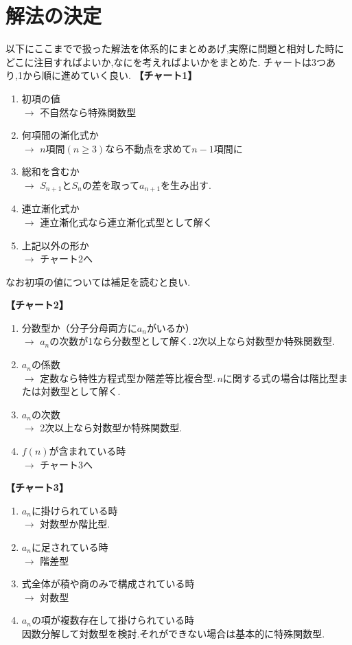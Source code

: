 
  \section{解法の決定}
    以下にここまでで扱った解法を体系的にまとめあげ,実際に問題と相対した時にどこに注目すればよいか,なにを考えればよいかをまとめた.
    チャートは3つあり,1から順に進めていく良い.
    \noindent \textbf{【チャート1】}
    \begin{enumerate}
      \item 初項の値\\
            $\rightarrow$ 不自然なら特殊関数型
      \item 何項間の漸化式か\\
            $\rightarrow$ $n$項間$(n\ge3)$なら不動点を求めて$n-1$項間に
      \item 総和を含むか\\
            $\rightarrow$ $S_{n+1}$と$S_n$の差を取って$a_{n+1}$を生み出す.
      \item 連立漸化式か\\
            $\rightarrow$ 連立漸化式なら連立漸化式型として解く
      \item 上記以外の形か\\
            $\rightarrow$ チャート2へ
    \end{enumerate}
    なお初項の値については補足を読むと良い.

    \noindent \textbf{【チャート2】}
    \begin{enumerate}
        \item 分数型か（分子分母両方に$a_n$がいるか）\\
              $\rightarrow$ $a_n$の次数が1なら分数型として解く.\,2次以上なら対数型か特殊関数型.
        \item $a_n$の係数\\
              $\rightarrow$ 定数なら特性方程式型か階差等比複合型.\,$n$に関する式の場合は階比型または対数型として解く.
        \item $a_n$の次数\\
              $\rightarrow$ 2次以上なら対数型か特殊関数型.
        \item $f(n)$が含まれている時\\
              $\rightarrow$ チャート3へ
    \end{enumerate}

    \noindent \textbf{【チャート3】}
    \begin{enumerate}
      \item $a_n$に掛けられている時\\
            $\rightarrow$ 対数型か階比型.
      \item $a_n$に足されている時\\
            $\rightarrow$ 階差型
      \item 式全体が積や商のみで構成されている時\\
            $\rightarrow$ 対数型
      \item $a_n$の項が複数存在して掛けられている時\\
            因数分解して対数型を検討.それができない場合は基本的に特殊関数型.
    \end{enumerate}

